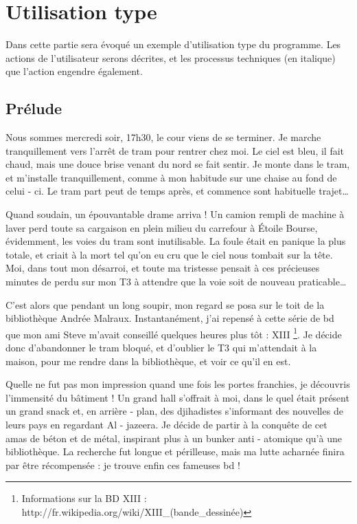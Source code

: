 \section{Utilisation type}
Dans cette partie sera évoqué un exemple d'utilisation type du programme.
Les actions de l'utilisateur serons décrites, et les processus techniques (en italique) que l'action engendre également. 

\subsection{Prélude}
Nous sommes mercredi soir, 17h30, le cour viens de se terminer. 
Je marche tranquillement vers l'arrêt de tram pour rentrer chez moi.
Le ciel est bleu, il fait chaud, mais une douce brise venant du nord se fait sentir. 
Je monte dans le tram, et m'installe tranquillement, comme à mon habitude sur une chaise au fond de celui - ci. 
Le tram part peut de temps après, et commence sont habituelle trajet…

Quand soudain, un épouvantable drame arriva ! 
Un camion rempli de machine à laver perd toute sa cargaison en plein milieu du carrefour à Étoile Bourse, évidemment, les voies du tram sont inutilisable. 
La foule était en panique la plus totale, et criait à la mort tel qu'on eu cru que le ciel nous tombait sur la tête. 
Moi, dans tout mon désarroi, et toute ma tristesse pensait à ces précieuses minutes de perdu sur mon T3 à attendre que la voie soit de nouveau praticable…

C'est alors que pendant un long soupir, mon regard se posa sur le toit de la bibliothèque Andrée Malraux. 
Instantanément, j'ai repensé à cette série de bd que mon ami Steve m'avait conseillé quelques heures plus tôt : XIII
\footnote{Informations sur la BD XIII : http://fr.wikipedia.org/wiki/XIII\_(bande\_dessinée)}. 
Je décide donc d'abandonner le tram bloqué, et d'oublier le T3 qui m'attendait à la maison, pour me rendre dans la bibliothèque, et voir ce qu'il en est. 

Quelle ne fut pas mon impression quand une fois les portes franchies, je découvris l'immensité du bâtiment !
Un grand hall s'offrait à moi, dans le quel était présent un grand snack et, en arrière - plan, des djihadistes s'informant des nouvelles de leurs pays en regardant Al - jazeera. 
Je décide de partir à la conquête de cet amas de béton et de métal, inspirant plus à un bunker anti - atomique qu'à une bibliothèque. 
La recherche fut longue et périlleuse, mais ma lutte acharnée finira par être récompensée : je trouve enfin ces fameuses bd !

